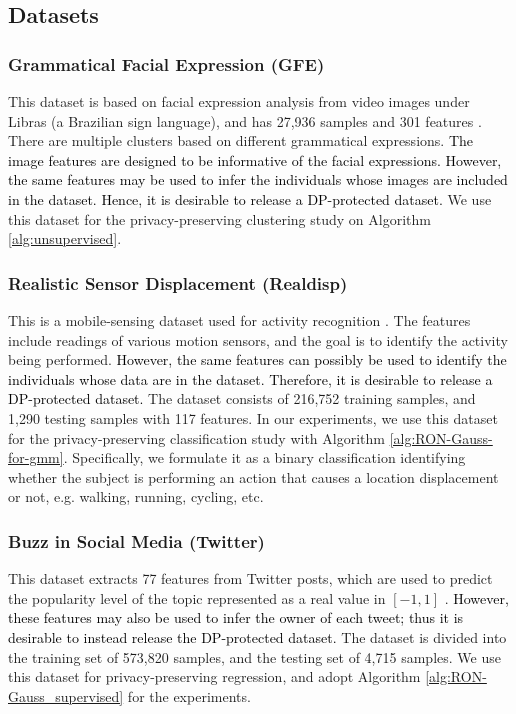 \documentclass[USenglish,oneside,twocolumn]{article}
\theoremstyle{definition}
\theoremstyle{remark}
\theoremstyle{plain}
\theoremstyle{plain}
\newcommand{\chang}{\textcolor{black}}
\begin{document}
\vspace{-1em}
\subsection{Datasets}
\vspace{-1em}
\subsubsection{Grammatical Facial Expression (GFE)}
\vspace{-1em}
This dataset is based on facial expression analysis from
video images under Libras
(a Brazilian sign language), and has 27,936 samples and 301 features \cite{RefWorks:230}. There are multiple
clusters based on different grammatical expressions. \chang{The image features are designed to be informative of the facial expressions. However, the same features may be used to infer the individuals whose images are included in the dataset. Hence, it is desirable to release a DP-protected dataset.} We use this dataset for the privacy-preserving
clustering study on Algorithm \ref{alg:unsupervised}.

\vspace{-1.5em}
\subsubsection{Realistic Sensor Displacement (Realdisp)} 
\vspace{-1em}
This is a mobile-sensing dataset used for activity recognition \cite{RefWorks:207,RefWorks:358}. The
features include readings of various motion sensors, and the goal
is to identify the activity being performed. \chang{However, the same features can possibly be used to identify the individuals whose data are in the dataset. Therefore, it is desirable to release a DP-protected dataset.} The dataset consists
of 216,752 training samples, and 1,290 testing samples with 117 features.
In our experiments, we use this dataset for the privacy-preserving
classification study with Algorithm \ref{alg:RON-Gauss-for-gmm}.
Specifically, we formulate it as a binary classification \textendash{}
identifying whether the subject is performing an action that causes
a location displacement or not, e.g. walking, running, cycling, etc.


\vspace{-1.5em}
\subsubsection{Buzz in Social Media (Twitter)}
\vspace{-1em}
This dataset extracts 77 features from Twitter posts, which are used
to predict the popularity level of the topic represented as a real
value in $[-1,1]$ \cite{RefWorks:240}. \chang{However, these features may also be used to infer the owner of each tweet; thus it is desirable to instead release the DP-protected dataset.} The dataset is divided into the training set of
573,820 samples, and the testing set of 4,715 samples. We use this
dataset for privacy-preserving regression, and adopt Algorithm \ref{alg:RON-Gauss_supervised}
for the experiments.
\end{document}
